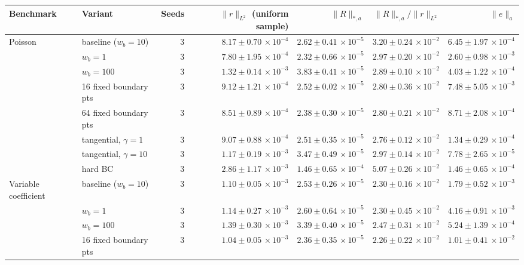 \begin{tabular}{llrrrrr}
\toprule
Benchmark & Variant & Seeds & $\|r\|_{L^2}$ (uniform sample) & $\|R\|_{*,a}$ & $\|R\|_{*,a}/\|r\|_{L^2}$ & $\|e\|_a$ \\
\midrule
Poisson & baseline ($w_b{=}10$) & 3 & $8.17\pm0.70\,\times\!10^{-4}$ & $2.62\pm0.41\,\times\!10^{-5}$ & $3.20\pm0.24\,\times\!10^{-2}$ & $6.45\pm1.97\,\times\!10^{-4}$ \\
 & $w_b{=}1$ & 3 & $7.80\pm1.95\,\times\!10^{-4}$ & $2.32\pm0.66\,\times\!10^{-5}$ & $2.97\pm0.20\,\times\!10^{-2}$ & $2.60\pm0.98\,\times\!10^{-3}$ \\
 & $w_b{=}100$ & 3 & $1.32\pm0.14\,\times\!10^{-3}$ & $3.83\pm0.41\,\times\!10^{-5}$ & $2.89\pm0.10\,\times\!10^{-2}$ & $4.03\pm1.22\,\times\!10^{-4}$ \\
 & 16 fixed boundary pts & 3 & $9.12\pm1.21\,\times\!10^{-4}$ & $2.52\pm0.02\,\times\!10^{-5}$ & $2.80\pm0.36\,\times\!10^{-2}$ & $7.48\pm5.05\,\times\!10^{-3}$ \\
 & 64 fixed boundary pts & 3 & $8.51\pm0.89\,\times\!10^{-4}$ & $2.38\pm0.30\,\times\!10^{-5}$ & $2.80\pm0.21\,\times\!10^{-2}$ & $8.71\pm2.08\,\times\!10^{-4}$ \\
 & tangential, $\gamma{=}1$ & 3 & $9.07\pm0.88\,\times\!10^{-4}$ & $2.51\pm0.35\,\times\!10^{-5}$ & $2.76\pm0.12\,\times\!10^{-2}$ & $1.34\pm0.29\,\times\!10^{-4}$ \\
 & tangential, $\gamma{=}10$ & 3 & $1.17\pm0.19\,\times\!10^{-3}$ & $3.47\pm0.49\,\times\!10^{-5}$ & $2.97\pm0.14\,\times\!10^{-2}$ & $7.78\pm2.65\,\times\!10^{-5}$ \\
 & hard BC & 3 & $2.86\pm1.17\,\times\!10^{-3}$ & $1.46\pm0.65\,\times\!10^{-4}$ & $5.07\pm0.26\,\times\!10^{-2}$ & $1.46\pm0.65\,\times\!10^{-4}$ \\
\midrule
Variable coefficient & baseline ($w_b{=}10$) & 3 & $1.10\pm0.05\,\times\!10^{-3}$ & $2.53\pm0.26\,\times\!10^{-5}$ & $2.30\pm0.16\,\times\!10^{-2}$ & $1.79\pm0.52\,\times\!10^{-3}$ \\
 & $w_b{=}1$ & 3 & $1.14\pm0.27\,\times\!10^{-3}$ & $2.60\pm0.64\,\times\!10^{-5}$ & $2.30\pm0.45\,\times\!10^{-2}$ & $4.16\pm0.91\,\times\!10^{-3}$ \\
 & $w_b{=}100$ & 3 & $1.39\pm0.30\,\times\!10^{-3}$ & $3.39\pm0.40\,\times\!10^{-5}$ & $2.47\pm0.31\,\times\!10^{-2}$ & $5.24\pm1.39\,\times\!10^{-4}$ \\
 & 16 fixed boundary pts & 3 & $1.04\pm0.05\,\times\!10^{-3}$ & $2.36\pm0.35\,\times\!10^{-5}$ & $2.26\pm0.22\,\times\!10^{-2}$ & $1.01\pm0.41\,\times\!10^{-2}$ \\

\end{tabular}
